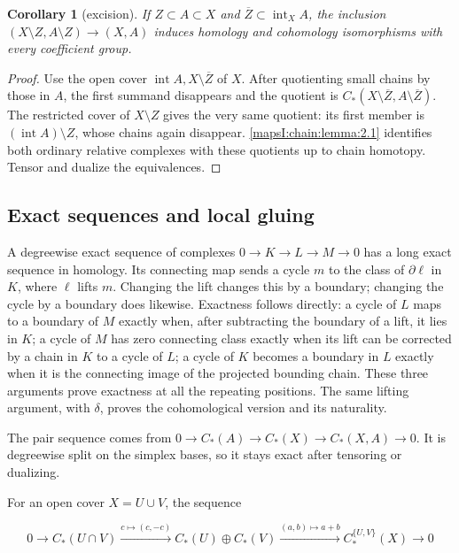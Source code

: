 \documentclass[11pt]{article}
\newtheorem{corollary}[theorem]{Corollary}
\begin{document}
\begin{corollary}[excision]
\label{mapsI:chain:corollary:2.2}
If \(Z\subset A\subset X\) and \(\overline Z\subset\operatorname{int}_X A\), the inclusion
\((X\setminus Z,A\setminus Z)\to(X,A)\)
induces homology and cohomology isomorphisms with every coefficient group.
\end{corollary}

\begin{proof}
Use the open cover \(\operatorname{int}A, X\setminus\overline Z\) of \(X\). After quotienting small chains by those in \(A\), the first summand disappears and the quotient is
\(C_*(X\setminus\overline Z,A\setminus\overline Z)\).
The restricted cover of \(X\setminus Z\) gives the very same quotient: its first member is \((\operatorname{int}A)\setminus Z\), whose chains again disappear. \cref{mapsI:chain:lemma:2.1} identifies both ordinary relative complexes with these quotients up to chain homotopy. Tensor and dualize the equivalences.
\end{proof}

\subsection{Exact sequences and local gluing}
\label{mapsI:chain:section-3}

A degreewise exact sequence of complexes \(0\to K\to L\to M\to0\) has a long exact sequence in homology. Its connecting map sends a cycle \(m\) to the class of \(\partial\ell\) in \(K\), where \(\ell\) lifts \(m\). Changing the lift changes this by a boundary; changing the cycle by a boundary does likewise. Exactness follows directly: a cycle of \(L\) maps to a boundary of \(M\) exactly when, after subtracting the boundary of a lift, it lies in \(K\); a cycle of \(M\) has zero connecting class exactly when its lift can be corrected by a chain in \(K\) to a cycle of \(L\); a cycle of \(K\) becomes a boundary in \(L\) exactly when it is the connecting image of the projected bounding chain. These three arguments prove exactness at all the repeating positions. The same lifting argument, with \(\delta\), proves the cohomological version and its naturality.

The pair sequence comes from
\(0\to C_*(A)\to C_*(X)\to C_*(X,A)\to0\).
It is degreewise split on the simplex bases, so it stays exact after tensoring or dualizing.

For an open cover \(X=U\cup V\), the sequence

\[
0\to C_*(U\cap V)\xrightarrow{c\mapsto(c,-c)}
C_*(U)\oplus C_*(V)\xrightarrow{(a,b)\mapsto a+b}
C_*^{\{U,V\}}(X)\to0
\]
\end{document}
